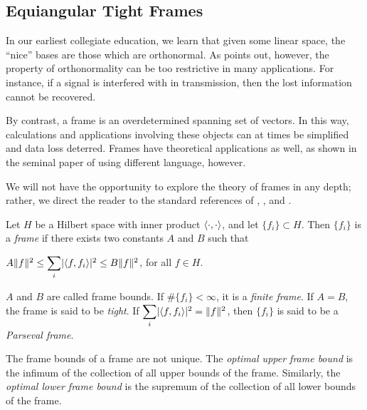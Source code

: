\documentclass[../../../main]{subfiles}
\begin{document}
\subsection{Equiangular Tight Frames}

In our earliest collegiate education, we learn that given some linear space, the
``nice'' bases are those which are orthonormal. As \cite{undergrad-frames}
points out, however, the property of orthonormality can be too restrictive in
many applications. For instance, if a signal is interfered with in
transmission, then the lost information cannot be recovered.  

By contrast, a frame is an overdetermined %
spanning set of vectors. In this way, calculations and applications involving these objects can at times be simplified and data loss deterred. Frames have theoretical applications as well, as shown in the seminal paper of \cite{paley-wiener} using different language, however.

We will not have the opportunity to explore the theory of frames in any depth; rather, we direct the reader to the standard references of \cite{intro-to-frame-theory}, \cite{waldron-tight-frames}, and \cite{young-nonharmonic-frames}.

\begin{defin}
 Let $H$ be a Hilbert space with inner product
 $\langle\cdot,\cdot\rangle$, and let $\{f_i\} \subset H$. Then $\{f_i\}$ is a {\it
   frame} if there exists two constants $A$ and $B$ such that 
 \begin{defenum}
  \item $A\Vert f \Vert^2 \leq \ssum_i \abs{\sharps{f,f_i}}^2 \leq B\Vert f
    \Vert^2$, for all $f \in H$. 
 \end{defenum}
 $A$ and $B$ are called frame bounds. If $\#\{f_i\} < \infty$, it is a {\it
   finite frame}. If $A=B$, the frame is said to be {\it tight}. If $\ssum_i
 \abs{\sharps{f,f_i}}^2 = \Vert f \Vert^2$, then $\{f_i\}$ is said to be a {\it
   Parseval frame}.   
\end{defin}

The frame bounds of a frame are not unique. The {\it optimal upper frame bound} is the infimum of the collection of all upper bounds of the frame. Similarly, the {\it optimal lower frame bound} is the supremum of the collection of all lower bounds of the frame.
\end{document}
